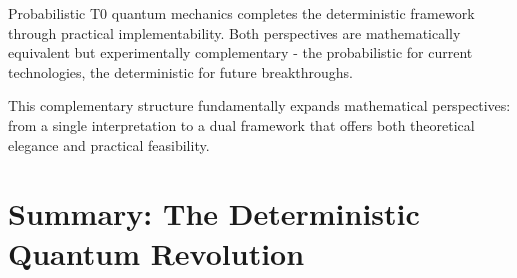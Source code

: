 \documentclass[12pt,a4paper]{article}
\theoremstyle{definition}
\theoremstyle{remark}
\begin{document}
\begin{tcolorbox}[colback=green!5!white,colframe=green!75!black,title=Complementary Completeness]
	Probabilistic T0 quantum mechanics completes the deterministic framework through practical implementability. Both perspectives are mathematically equivalent but experimentally complementary - the probabilistic for current technologies, the deterministic for future breakthroughs.
\end{tcolorbox}

This complementary structure fundamentally expands mathematical perspectives: from a single interpretation to a dual framework that offers both theoretical elegance and practical feasibility.	

	\section{Summary: The Deterministic Quantum Revolution}
\end{document}
